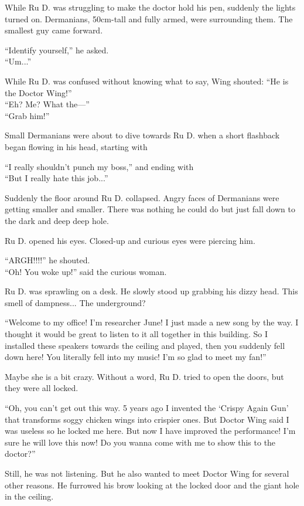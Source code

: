 While Ru D. was struggling to make the doctor hold his pen, suddenly the lights turned on. Dermanians, 50cm-tall and fully armed, were surrounding them. The smallest guy came forward.

``Identify yourself,'' he asked. \\
``Um...'' 

While Ru D. was confused without knowing what to say, Wing shouted:
``He is the Doctor Wing!''\\
``Eh? Me? What the—''\\
``Grab him!''

Small Dermanians were about to dive towards Ru D. when a short flashback began flowing in his head, starting with

``I really shouldn't punch my boss,'' and ending with \\
``But I really hate this job...'' 

Suddenly the floor around Ru D. collapsed. Angry faces of Dermanians were getting smaller and smaller. There was nothing he could do but just fall down to the dark and deep deep hole. 

Ru D. opened his eyes. Closed-up and curious eyes were piercing him.

``ARGH!!!!'' he shouted. \\
``Oh! You woke up!'' said the curious woman.

Ru D. was sprawling on a desk. He slowly stood up grabbing his dizzy head. This smell of dampness... The underground? 

``Welcome to my office! I'm researcher June! I just made a new song by the way. I thought it would be great to listen to it all together in this building. So I installed these speakers towards the ceiling and played, then you suddenly fell down here! You literally fell into my music! I'm so glad to meet my fan!'' 

Maybe she is a bit crazy. Without a word, Ru D. tried to open the doors, but they were all locked.

``Oh, you can't get out this way. 5 years ago I invented the `Crispy Again Gun' that transforms soggy chicken wings into crispier ones. But Doctor Wing said I was useless so he locked me here. But now I have improved the performance! I'm sure he will love this now! Do you wanna come with me to show this to the doctor?'' 

Still, he was not listening. But he also wanted to meet Doctor Wing for several other reasons. He furrowed his brow looking at the locked door and the giant hole in the ceiling.

